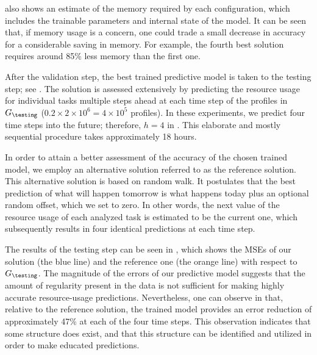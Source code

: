  also shows an estimate of the memory required by each
configuration, which includes the trainable parameters and internal state of the
model. It can be seen that, if memory usage is a concern, one could trade a
small decrease in accuracy for a considerable saving in memory. For example, the
fourth best solution requires around 85\% less memory than the first one.

After the validation step, the best trained predictive model is taken to the
testing step; see . The solution is assessed extensively by
predicting the resource usage for individual tasks multiple steps ahead at each
time step of the profiles in $G_\testing$ ($0.2 \times 2 \times 10^6 = 4 \times
10^5$ profiles). In these experiments, we predict four time steps into the
future; therefore, $h = 4$ in . This elaborate and mostly
sequential procedure takes approximately 18 hours.

In order to attain a better assessment of the accuracy of the chosen trained
model, we employ an alternative solution referred to as the reference solution.
This alternative solution is based on random walk. It postulates that the best
prediction of what will happen tomorrow is what happens today plus an optional
random offset, which we set to zero. In other words, the next value of the
resource usage of each analyzed task is estimated to be the current one, which
subsequently results in four identical predictions at each time step.

The results of the testing step can be seen in , which shows
the \acp{MSE} of our solution (the blue line) and the reference one (the orange
line) with respect to $G_\testing$. The magnitude of the errors of our
predictive model suggests that the amount of regularity present in the data is
not sufficient for making highly accurate resource-usage predictions.
Nevertheless, one can observe in  that, relative to the
reference solution, the trained model provides an error reduction of
approximately 47\% at each of the four time steps. This observation indicates
that some structure does exist, and that this structure can be identified and
utilized in order to make educated predictions.
